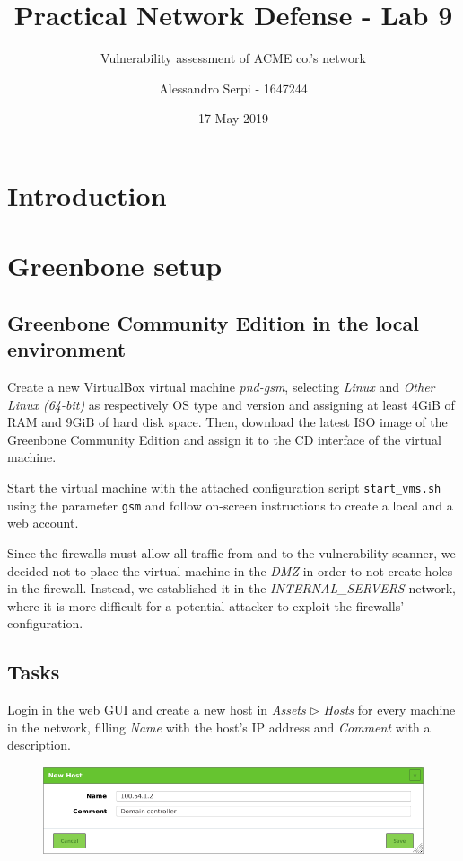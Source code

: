 \documentclass[draft]{homework}
\title{Practical Network Defense - Lab 9}
\subtitle{Vulnerability assessment of ACME co.'s network}
\author{Alessandro Serpi - 1647244}
\date{17 May 2019}
\begin{document}
    \maketitle
    \tableofcontents
    
    
    \pagebreak
    \section{Introduction}
    
    
    \section{Greenbone setup}
    \subsection{Greenbone Community Edition in the local environment}
    Create a new VirtualBox virtual machine \textit{pnd-gsm}, selecting \textit{Linux} and \textit{Other Linux (64-bit)} as respectively OS type and version and assigning at least 4GiB of RAM and 9GiB of hard disk space.
    Then, download the latest ISO image of the Greenbone Community Edition and assign it to the CD interface of the virtual machine.
    
    Start the virtual machine with the attached configuration script \texttt{start\_vms.sh} using the parameter \texttt{gsm} and follow on-screen instructions to create a local and a web account.
    
    Since the firewalls must allow all traffic from and to the vulnerability scanner, we decided not to place the virtual machine in the \textit{DMZ} in order to not create holes in the firewall.
    Instead, we established it in the \textit{INTERNAL\_SERVERS} network, where it is more difficult for a potential attacker to exploit the firewalls' configuration.
    
    \subsection{Tasks}
    Login in the web GUI and create a new host in \textit{Assets} $\triangleright$ \textit{Hosts} for every machine in the network, filling \textit{Name} with the host's IP address and \textit{Comment} with a description.
    \vspace{-5pt}
    \begin{figure}[H]
        \centering
        \includegraphics[width=1\linewidth]{images/new-host}
        \label{fig:new-host}
    \end{figure}
    \vspace{-20pt}
    
\end{document}
